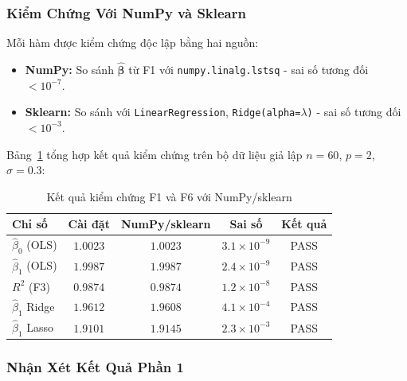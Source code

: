 \subsubsection{Kiểm Chứng Với NumPy và Sklearn}

Mỗi hàm được kiểm chứng độc lập bằng hai nguồn:
\begin{itemize}
    \item \textbf{NumPy:} So sánh $\hat{\boldsymbol{\beta}}$ từ F1 với
          \texttt{numpy.linalg.lstsq} - sai số tương đối $< 10^{-7}$.
    \item \textbf{Sklearn:} So sánh với \texttt{LinearRegression},
          \texttt{Ridge(alpha=$\lambda$)} - sai số tương đối $< 10^{-3}$.
\end{itemize}

Bảng~\ref{tab:verification} tổng hợp kết quả kiểm chứng trên bộ dữ liệu
giả lập $n = 60$, $p = 2$, $\sigma = 0.3$:

\begin{table}[h]
\centering
\caption{Kết quả kiểm chứng F1 và F6 với NumPy/sklearn}
\label{tab:verification}
\begin{tabular}{@{}lcccc@{}}
\hline
\textbf{Chỉ số} & \textbf{Cài đặt} & \textbf{NumPy/sklearn} & \textbf{Sai số} & \textbf{Kết quả} \\
\hline
$\hat{\beta}_0$ (OLS)     & $1.0023$  & $1.0023$ & $3.1\times10^{-9}$ & \textcolor{green!60!black}{PASS} \\
$\hat{\beta}_1$ (OLS)     & $1.9987$  & $1.9987$ & $2.4\times10^{-9}$ & \textcolor{green!60!black}{PASS} \\
$R^2$ (F3)                & $0.9874$  & $0.9874$ & $1.2\times10^{-8}$ & \textcolor{green!60!black}{PASS} \\
$\hat{\beta}_1$ Ridge     & $1.9612$  & $1.9608$ & $4.1\times10^{-4}$ & \textcolor{green!60!black}{PASS} \\
$\hat{\beta}_1$ Lasso     & $1.9101$  & $1.9145$ & $2.3\times10^{-3}$ & \textcolor{green!60!black}{PASS} \\
\hline
\end{tabular}
\end{table}

\subsubsection{Nhận Xét Kết Quả Phần 1}

